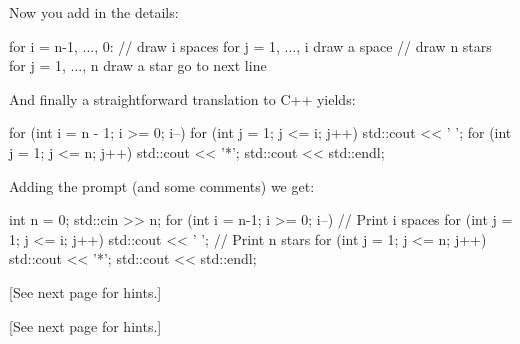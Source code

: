 Now you add in the details:
\begin{console}
for i = n-1, ..., 0:
      // draw i spaces
      for j = 1, ..., i
          draw a space
      // draw n stars
      for j = 1, ..., n
          draw a star
      go to next line
\end{console}

And finally a straightforward translation to C++ yields:
\begin{console}
for (int i = n - 1; i >= 0; i--)
{   
    for (int j = 1; j <= i; j++)
    {
        std::cout << ' ';
    }
    for (int j = 1; j <= n; j++)
    {
        std::cout << '*';
    }
    std::cout << std::endl;
}
\end{console}
Adding the prompt (and some comments) we get:
\begin{console}
int n = 0;
std::cin >> n;
for (int i = n-1; i >= 0; i--)
{   
    // Print i spaces
    for (int j = 1; j <= i; j++)
    {
        std::cout << ' ';
    }
    // Print n stars
    for (int j = 1; j <= n; j++)
    {
        std::cout << '*';
    }
    std::cout << std::endl;
}
\end{console}

[See next page for hints.]

[See next page for hints.]


